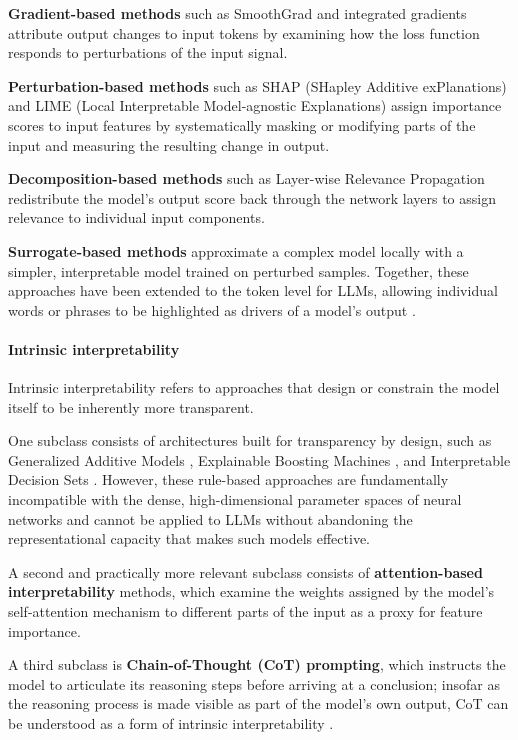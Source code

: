 \textbf{Gradient-based methods} such as SmoothGrad \cite{smilkov_smoothgrad_2017} and integrated gradients \cite{ancona_towards_2018} attribute output changes to input tokens by examining how the loss function responds to perturbations of the input signal. 

\textbf{Perturbation-based methods} such as SHAP (SHapley Additive exPlanations) \cite{lundberg_unified_2017} and LIME (Local Interpretable Model-agnostic Explanations)\cite{ribeiro_why_2016} assign importance scores to input features by systematically masking or modifying parts of the input and measuring the resulting change in output. 

\textbf{Decomposition-based methods} such as Layer-wise Relevance Propagation \cite{binder_layer-wise_2016} redistribute the model's output score back through the network layers to assign relevance to individual input components. 

\textbf{Surrogate-based methods} approximate a complex model locally with a simpler, interpretable model trained on perturbed samples. Together, these approaches have been extended to the token level for LLMs, allowing individual words or phrases to be highlighted as drivers of a model's output \cite{wu_usable_2025}.

\paragraph{Intrinsic interpretability}
Intrinsic interpretability refers to approaches that design or constrain the model itself to be inherently more transparent. 

One subclass consists of architectures built for transparency by design, such as Generalized Additive Models \cite{caruana_intelligible_2015}, Explainable Boosting Machines \cite{lou_accurate_2013}, and Interpretable Decision Sets \cite{lakkaraju_interpretable_2016}. However, these rule-based approaches are fundamentally incompatible with the dense, high-dimensional parameter spaces of neural networks and cannot be applied to LLMs without abandoning the representational capacity that makes such models effective. 

A second and practically more relevant subclass consists of \textbf{attention-based interpretability} methods, which examine the weights assigned by the model's self-attention mechanism to different parts of the input as a proxy for feature importance. 

A third subclass is \textbf{Chain-of-Thought (CoT) prompting}, which instructs the model to articulate its reasoning steps before arriving at a conclusion; insofar as the reasoning process is made visible as part of the model's own output, CoT can be understood as a form of intrinsic interpretability \cite{wu_usable_2025}.

